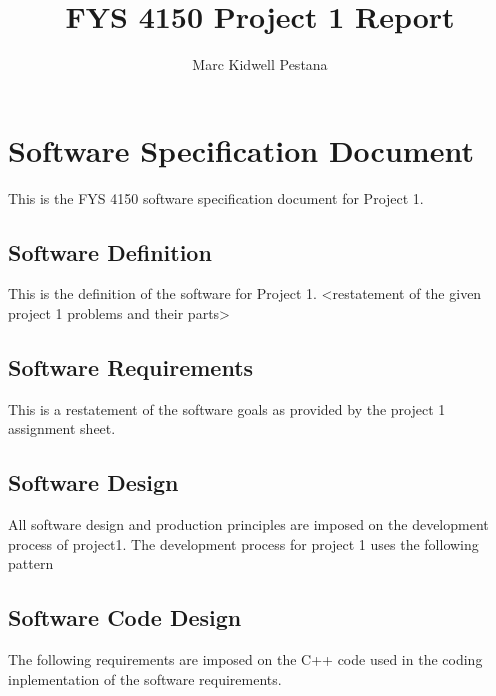 \documentclass[11pt, oneside]{article}   	%
\title{FYS 4150 Project 1 Report}
\author{Marc Kidwell Pestana}
\date{}							%
\begin{document}
\maketitle
\section{Software Specification Document}
This is the FYS 4150 software specification document for Project 1.
\subsection{Software Definition}
This is the definition of the software for Project 1.  <restatement of the given project 1 problems and their parts>
\subsection{Software Requirements}
This is a restatement of the software goals as provided by the project 1 assignment sheet.
\subsection{Software Design}
All software design and production principles are imposed on the development process of project1.
The development process for project 1 uses the following pattern

\subsection{Software Code Design}
The following requirements are imposed on the C++ code used in the coding inplementation of the software requirements.
\end{document}
